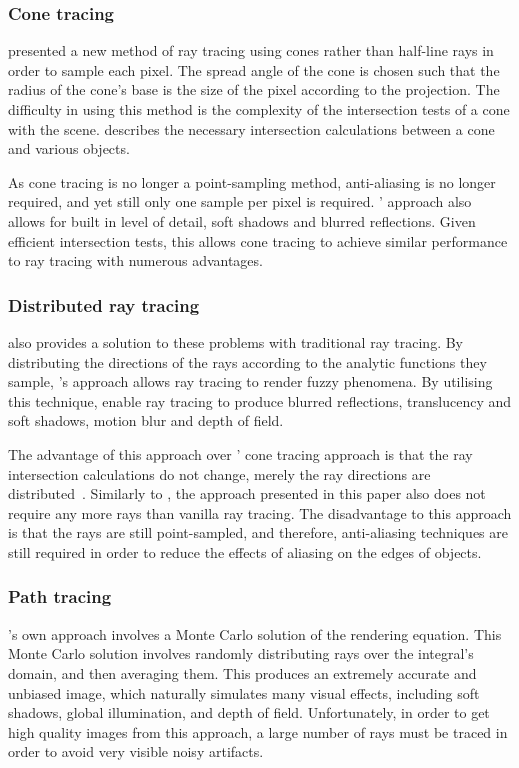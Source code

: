 \subsubsection{Cone tracing}
\citeauthor{amanatides84conetracing} presented a new method of ray tracing using cones rather than half-line rays in order to sample each pixel. The spread angle of the cone is chosen such that the radius of the cone's base is the size of the pixel according to the projection. The difficulty in using this method is the complexity of the intersection tests of a cone with the scene. \citeauthor{amanatides84conetracing} describes the necessary intersection calculations between a cone and various objects.

As cone tracing is no longer a point-sampling method, anti-aliasing is no longer required, and yet still only one sample per pixel is required. \citeauthor{amanatides84conetracing}' approach also allows for built in level of detail, soft shadows and blurred reflections. Given efficient intersection tests, this allows cone tracing to achieve similar performance to ray tracing with numerous advantages.

\subsubsection{Distributed ray tracing}
\cite{cook84distributed} also provides a solution to these problems with traditional ray tracing. By distributing the directions of the rays according to the analytic functions they sample, \citeauthor{cook84distributed}'s approach allows ray tracing to render fuzzy phenomena. By utilising this technique, \citeauthor{cook84distributed} enable ray tracing to produce blurred reflections, translucency and soft shadows, motion blur and depth of field.

The advantage of this approach over \citeauthor{amanatides84conetracing}' cone tracing approach is that the ray intersection calculations do not change, merely the ray directions are distributed~\parencite{cook84distributed}. Similarly to \cite{amanatides84conetracing}, the approach presented in this paper also does not require any more rays than vanilla ray tracing. The disadvantage to this approach is that the rays are still point-sampled, and therefore, anti-aliasing techniques are still required in order to reduce the effects of aliasing on the edges of objects.

\subsubsection{Path tracing}
\citeauthor{kajiya86therendering}'s own approach involves a Monte Carlo solution of the rendering equation. This Monte Carlo solution involves randomly distributing rays over the integral's domain, and then averaging them. This produces an extremely accurate and unbiased image, which naturally simulates many visual effects, including soft shadows, global illumination, and depth of field. Unfortunately, in order to get high quality images from this approach, a large number of rays must be traced in order to avoid very visible noisy artifacts.

